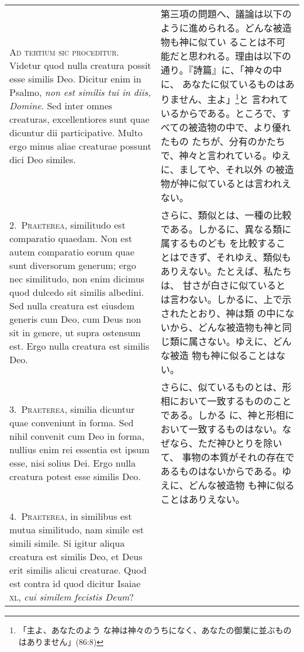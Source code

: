 \documentclass[10pt]{jsarticle}
\begin{document}
\begin{longtable}{p{21em}p{21em}}
{\huge A}{\scshape d tertium sic proceditur}. Videtur quod nulla
creatura possit esse similis Deo. Dicitur enim in Psalmo, {\itshape
non est similis tui in diis, Domine}. Sed inter omnes creaturas,
excellentiores sunt quae dicuntur dii participative. Multo ergo minus
aliae creaturae possunt dici Deo similes.


&

第三項の問題へ、議論は以下のように進められる。どんな被造物も神に似てい
ることは不可能だと思われる。理由は以下の通り。『詩篇』に、「神々の中に、
あなたに似ているものはありません、主よ」\footnote{「主よ、あなたのよう
な神は神々のうちになく、あなたの御業に並ぶものはありません」(86:8)}と
言われているからである。ところで、すべての被造物の中で、より優れたもの
たちが、分有のかたちで、神々と言われている。ゆえに、ましてや、それ以外
の被造物が神に似ているとは言われえない。

\\

2.~{\scshape Praeterea}, similitudo est comparatio quaedam. Non est
 autem comparatio eorum quae sunt diversorum generum; ergo nec
 similitudo, non enim dicimus quod dulcedo sit similis albedini. Sed
 nulla creatura est eiusdem generis cum Deo, cum Deus non sit in
 genere, ut supra ostensum est. Ergo nulla creatura est similis Deo.

 &

さらに、類似とは、一種の比較である。しかるに、異なる類に属するものども
を比較することはできず、それゆえ、類似もありえない。たとえば、私たちは、
甘さが白さに似ているとは言わない。しかるに、上で示されたとおり、神は類
の中にないから、どんな被造物も神と同じ類に属さない。ゆえに、どんな被造
物も神に似ることはない。

\\

3.~{\scshape Praeterea}, similia dicuntur quae conveniunt in
 forma. Sed nihil convenit cum Deo in forma, nullius enim rei essentia
 est ipsum esse, nisi solius Dei. Ergo nulla creatura potest esse
 similis Deo.

&

さらに、似ているものとは、形相において一致するもののことである。しかる
に、神と形相において一致するものはない。なぜなら、ただ神ひとりを除いて、
事物の本質がそれの存在であるものはないからである。ゆえに、どんな被造物
も神に似ることはありえない。

\\

4.~{\scshape Praeterea}, in similibus est mutua similitudo, nam simile
est simili simile. Si igitur aliqua creatura est similis Deo, et Deus
erit similis alicui creaturae. Quod est contra id quod dicitur Isaiae
{\scshape xl}, {\itshape cui similem fecistis Deum}?


\end{longtable}
\end{document}
